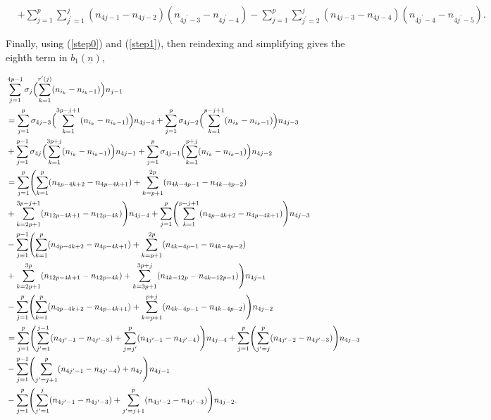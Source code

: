 \documentclass[11pt,reqno]{amsart}
\theoremstyle{definition}
\numberwithin{equation}{section}
\begin{document}
\begin{equation}  \label{sevenb1}
\begin{aligned}
& + \sum_{j=1}^{p} \sum_{j^{\prime} = 1}^{j} (n_{4j-1} - n_{4j-2})(n_{4j^{\prime} - 3} - n_{4j^{\prime} - 4}) - \sum_{j=1}^{p} \sum_{j^{\prime}=2}^{j} (n_{4j-3} - n_{4j-4})(n_{4j^{\prime}-4} - n_{4j^{\prime} - 5}).
\end{aligned}
\end{equation}

\noindent Finally, using (\ref{step0}) and (\ref{step1}), then reindexing and simplifying gives the eighth term in $b_1(\underline{n})$, 

\begin{equation} \label{lastb1}
\begin{aligned}
& \sum_{j=1}^{4p-1} \sigma_j \Bigl( \sum_{k=1}^{r^{\prime}(j)} (n_{i_k} - n_{i_k - 1}) \Bigr) n_{j-1} \\
& = \sum_{j=1}^{p} \sigma_{4j-3} \Bigl( \sum_{k=1}^{3p-j+1} (n_{i_k} - n_{i_k - 1}) \Bigr) n_{4j-4} +  \sum_{j=1}^{p} \sigma_{4j-2} \Bigl( \sum_{k=1}^{p-j+1} (n_{i_k} - n_{i_k - 1}) \Bigr) n_{4j-3} \\
& +  \sum_{j=1}^{p-1} \sigma_{4j} \Bigl( \sum_{k=1}^{3p+j} (n_{i_k} - n_{i_k - 1}) \Bigr) n_{4j-1} +  \sum_{j=1}^{p} \sigma_{4j-1} \Bigl( \sum_{k=1}^{p+j} (n_{i_k} - n_{i_k - 1}) \Bigr) n_{4j-2} \\
& = \sum_{j=1}^{p} \Biggl( \sum_{k=1}^{p} (n_{4p-4k+2} - n_{4p-4k+1}) + \sum_{k=p+1}^{2p} (n_{4k-4p-1} - n_{4k-4p-2}) \\
& + \sum_{k=2p+1}^{3p-j+1} (n_{12p - 4k + 1} - n_{12p - 4k}) \Biggr) n_{4j-4} + \sum_{j=1}^{p} \Biggl( \sum_{k=1}^{p-j+1} (n_{4p-4k+2} - n_{4p-4k+1}) \Biggr) n_{4j-3} \\
& - \sum_{j=1}^{p-1} \Biggl( \sum_{k=1}^{p} (n_{4p-4k+2} - n_{4p-4k+1}) + \sum_{k=p+1}^{2p} (n_{4k-4p-1} - n_{4k-4p-2}) \\
& + \sum_{k=2p+1}^{3p} (n_{12p - 4k + 1} - n_{12p - 4k}) + \sum_{k=3p+1}^{3p+j} (n_{4k-12p} - n_{4k-12p-1}) \Biggr) n_{4j-1} \\
& - \sum_{j=1}^{p} \Biggl( \sum_{k=1}^{p} (n_{4p-4k+2} - n_{4p-4k+1}) + \sum_{k=p+1}^{p+j} (n_{4k-4p-1} - n_{4k-4p-2}) \Biggr) n_{4j-2} \\
& = \sum_{j=1}^{p} \Biggl( \sum_{j^{\prime}=1}^{j-1} (n_{4j^{\prime} - 1} - n_{4j^{\prime} - 3}) + \sum_{j=j^{\prime}}^{p} (n_{4j^{\prime} - 1} - n_{4j^{\prime} - 4}) \Biggr) n_{4j-4} + \sum_{j=1}^{p} \Biggl( \sum_{j^{\prime} = j}^{p} (n_{4j^{\prime} - 2} - n_{4j^{\prime} - 3} ) \Biggr) n_{4j-3} \\
& - \sum_{j=1}^{p-1} \Biggl( \sum_{j^{\prime} = j+1}^{p} (n_{4j^{\prime} - 1} - n_{4j^{\prime} - 4}) + n_{4j}\Biggr) n_{4j-1} \\
& - \sum_{j=1}^{p} \Biggl( \sum_{j^{\prime}=1}^{j} (n_{4j^{\prime} - 1} - n_{4j^{\prime} - 3}) + \sum_{j^{\prime}=j+1}^{p} (n_{4j^{\prime} - 2} - n_{4j^{\prime} - 3}) \Biggr) n_{4j-2}.
\end{aligned}
\end{equation}
\end{document}
